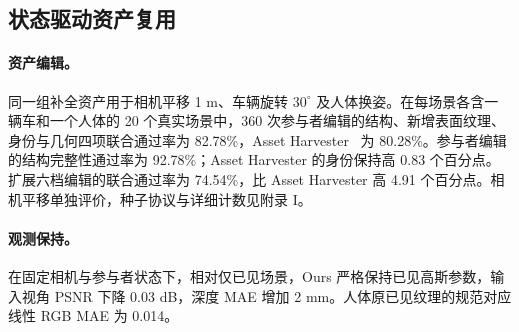 \begin{table}[!htbp]
\centering
\footnotesize
\setlength{\tabcolsep}{2.5pt}
\renewcommand{\arraystretch}{1.08}
\caption{\textbf{离轨视图分布质量。}左右方向分别计算 FID/FVD 后取均值。}
\label{tab:spatial_current}
\end{table}

\subsection{状态驱动资产复用}
\label{sec:ablation-reuse}
\paragraph{资产编辑。}
同一组补全资产用于相机平移 1 m、车辆旋转 $30^\circ$ 及人体换姿。在每场景各含一辆车和一个人体的 20 个真实场景中，360 次参与者编辑的结构、新增表面纹理、身份与几何四项联合通过率为 82.78\%，Asset Harvester~\cite{cao2026assetharvester} 为 80.28\%。参与者编辑的结构完整性通过率为 92.78\%；Asset Harvester 的身份保持高 0.83 个百分点。扩展六档编辑的联合通过率为 74.54\%，比 Asset Harvester 高 4.91 个百分点。相机平移单独评价，种子协议与详细计数见附录 I。

\paragraph{观测保持。}
\label{sec:observation-preservation}
在固定相机与参与者状态下，相对仅已见场景，Ours 严格保持已见高斯参数，输入视角 PSNR 下降 0.03 dB，深度 MAE 增加 2 mm。人体原已见纹理的规范对应线性 RGB MAE 为 0.014。

